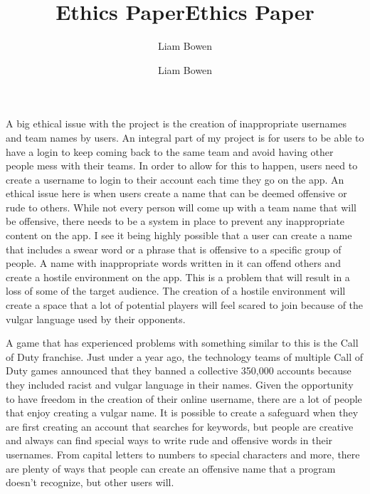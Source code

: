 \documentclass[12pt, twocolumn]{article}
\title{Ethics Paper}
\author{Liam Bowen}
\begin{document}
\title{Ethics Paper}
\author{Liam Bowen}

\maketitle

A big ethical issue with the project is the creation of inappropriate usernames and team names by users. An integral part of my project is for users to be able to have a login to keep coming back to the same team and avoid having other people mess with their teams. In order to allow for this to happen, users need to create a username to login to their account each time they go on the app. An ethical issue here is when users create a name that can be deemed offensive or rude to others. While not every person will come up with a team name that will be offensive, there needs to be a system in place to prevent any inappropriate content on the app. I see it being highly possible that a user can create a name that includes a swear word or a phrase that is offensive to a specific group of people. A name with inappropriate words written in it can offend others and create a hostile environment on the app. This is a problem that will result in a loss of some of the target audience. The creation of a hostile environment will create a space that a lot of potential players will feel scared to join because of the vulgar language used by their opponents. 

A game that has experienced problems with something similar to this is the Call of Duty franchise. Just under a year ago, the technology teams of multiple Call of Duty games announced that they banned a collective 350,000 accounts because they included racist and vulgar language in their names. Given the opportunity to have freedom in the creation of their online username, there are a lot of people that enjoy creating a vulgar name. It is possible to create a safeguard when they are first creating an account that searches for keywords, but people are creative and always can find special ways to write rude and offensive words in their usernames. From capital letters to numbers to special characters and more, there are plenty of ways that people can create an offensive name that a program doesn’t recognize, but other users will. 
\end{document}

